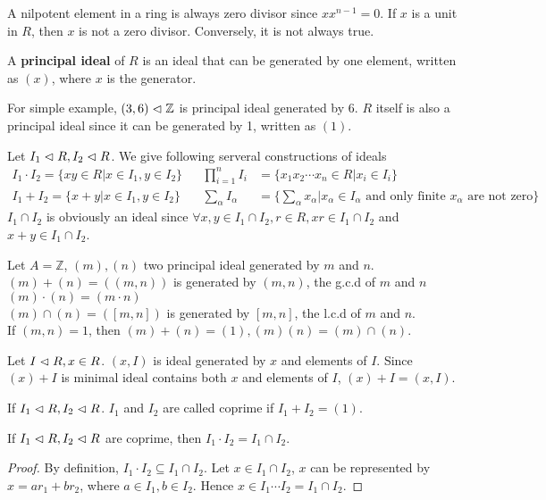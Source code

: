 \documentclass{amsart}
\begin{document}
\begin{rem}
	A nilpotent element in a ring is always zero divisor since $x x^{n-1}=0$. If $x$ is a unit in $R$, then $x$ is not a zero divisor. Conversely, it is not always true.
\end{rem}

\begin{secdefn}
	A \textbf{principal ideal} of $R$ is an ideal that can be generated by one element, written as $(x)$, where $x$ is the generator.
\end{secdefn}
For simple example, $(3,6) \vartriangleleft \mathbb{Z}$ is principal ideal generated by 6. $R$ itself is also a principal ideal since it can be generated by 1, written as $(1)$.

Let $I_1 \vartriangleleft R, I_2 \vartriangleleft R$. We give following serveral constructions of ideals
\[
\begin{aligned}
I_1 \cdot I_2 = \{ xy \in R| x \in I_1, y \in I_2\}& & \prod_{i=1}^{n} I_i &= \{ x_1 x_2 \cdots x_n \in R| x_i \in I_i\}&\\
I_1 + I_2 = \{x+y| x\in I_1, y \in I_2 \}& & \sum_{\alpha}I_\alpha &= \{\sum_{\alpha} x_\alpha | x_\alpha \in I_\alpha \text{ and only finite }x_\alpha \text{ are not zero} \}&
\end{aligned}
\]
$I_1 \cap I_2$ is obviously an ideal since $\forall x, y \in I_1 \cap I_2, r\in R, xr \in I_1 \cap I_2$ and $x+y \in I_1 \cap I_2$.

\begin{ex}
	Let $A= \mathbb{Z}$, $(m),(n)$ two principal ideal generated by $m$ and $n$.\\
	$(m)+(n) = ((m,n))$ is generated by $(m,n)$, the g.c.d of $m$ and $n$\\
	$(m)\cdot(n) = (m\cdot n)$\\
	$(m) \cap (n) =([m,n])$ is generated by $[m,n]$, the l.c.d of $m$ and $n$.\\
	If $(m,n)=1$, then $(m)+(n)=(1), (m)(n)=(m)\cap(n)$.
\end{ex}
Let $I \vartriangleleft R , x\in R$. $(x,I)$ is ideal generated by $x$ and elements of $I$. Since $(x)+I$ is minimal ideal contains both $x$ and elements of $I$, $(x)+I =(x,I)$.
\begin{secdefn}
	If $I_1 \vartriangleleft R, I_2 \vartriangleleft R$. $I_1$ and $I_2$ are called coprime if $I_1 + I_2 = (1)$.
\end{secdefn}

\begin{secprop}
	\label{prop1}
	If $I_1 \vartriangleleft R, I_2 \vartriangleleft R$ are coprime, then $I_1 \cdot I_2 = I_1 \cap I_2$.
\end{secprop}
\begin{proof}
	By definition, $I_1 \cdot I_2 \subseteq I_1 \cap I_2$. Let $x \in I_1 \cap I_2$, $x$ can be represented by $x=ar_1 +b r_2$, where $a \in I_1, b\in I_2$. Hence $x \in I_1 \cdots I_2= I_1 \cap I_2$.
\end{proof}
\end{document}
